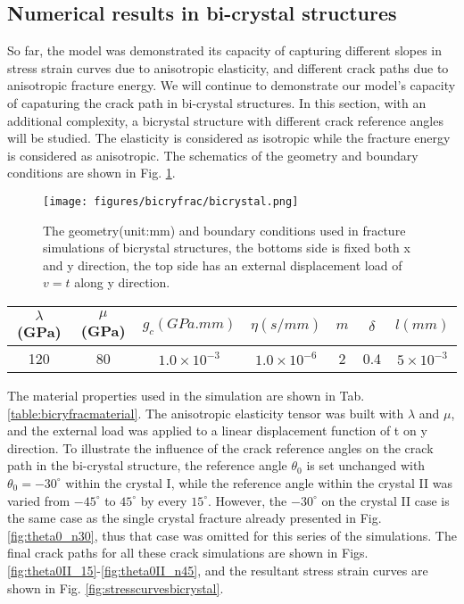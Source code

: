 \documentclass[3p,10pt,sort&compress]{elsarticle}
\begin{document}
\subsection{Numerical results in bi-crystal structures}
So far, the model was demonstrated its capacity of capturing different slopes in stress strain curves due to anisotropic elasticity, and different crack paths due to anisotropic fracture energy. We will continue to demonstrate our model's capacity of capaturing the crack path in bi-crystal structures. In this section, with an additional complexity, a bicrystal structure with different crack reference angles will be studied. The elasticity is considered as isotropic while the fracture energy is considered as anisotropic. The schematics of the geometry and boundary conditions are shown in Fig. \ref{fig:bicrystalstructure}.
\begin{figure}[!htb]
  \begin{center}
    \texttt{[image: figures/bicryfrac/bicrystal.png]}
    \caption{ The geometry(unit:mm) and boundary conditions used in fracture simulations of bicrystal structures, the bottoms side is fixed both x and y direction, the top side has an external displacement load of $v=t$ along y direction.}
    \label{fig:bicrystalstructure}
  \end{center}
\end{figure}

\begin{table*}[!htb]
  \centering
  \begin{tabular}{ |c|c|c|c|c|c|c| }
    \hline
    $\lambda$(GPa) & $\mu$(GPa) & $g_c(GPa.mm)$ & $\eta(s/mm)$ & $m$ & $\delta$ & $l(mm)$\\
    \hline
    120  & 80  &  $1.0\times 10^{-3}$ & $1.0\times 10^{-6}$ & 2 & 0.4 & $5\times10^{-3}$\\
    \hline
  \end{tabular}
  \caption{Material properties used in the bi-crystal fracture simulations}
  \label{table:bicryfracmaterial}
\end{table*}

The material properties used in the simulation are shown in Tab. \ref{table:bicryfracmaterial}. The anisotropic elasticity tensor was built with $\lambda$ and $\mu$, and the external load was applied to a linear displacement function of t on y direction. To illustrate the influence of the crack reference angles on the crack path in the bi-crystal structure, the reference angle $\theta_0$ is set unchanged with $\theta_0 = -30^{\circ}$ within the crystal I, while the reference angle within the crystal II was varied from $-45^{\circ}$ to $45^{\circ}$ by every $15^{\circ}$. However, the $-30^{\circ}$ on the crystal II case is  the same case as the single crystal fracture already presented in Fig. \ref{fig:theta0_n30}, thus that case was omitted for this series of the simulations. The final crack paths for all these crack simulations are shown in Figs. \ref{fig:theta0II_15}-\ref{fig:theta0II_n45}, and the resultant stress strain curves are shown in Fig. \ref{fig:stresscurvesbicrystal}.
\end{document}
